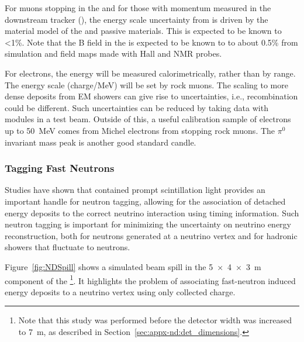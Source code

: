 
For muons stopping in the  and for those with momentum measured in the downstream tracker (), the energy scale uncertainty from  is driven by the material model of the  and passive materials.  This is expected to be known to \textless 1\%.  Note that the B field in the  is expected to be known to to about 0.5\% from simulation and field maps made with Hall and NMR probes.

For electrons, the energy will be measured calorimetrically, rather than by range.  The  energy scale (charge/MeV) will be set by rock muons.  The scaling to more dense deposits from EM showers can give rise to uncertainties, i.e., recombination could be different.  Such uncertainties can be reduced by taking data with  modules in a test beam.  Outside of this, a useful calibration sample
of electrons up to \SI{50}{MeV} comes from Michel electrons from stopping rock muons. The $\pi^0$ invariant mass peak is another good standard candle.



\subsubsection{Tagging Fast Neutrons}

Studies have shown that contained prompt scintillation light provides an important handle for neutron tagging, allowing for the association of detached energy deposits to the correct neutrino interaction using timing information. Such neutron tagging is important for minimizing the uncertainty on neutrino energy reconstruction, both for neutrons generated at a neutrino vertex and for hadronic showers that fluctuate to neutrons. 

Figure~\ref{fig:NDSpill} shows a simulated beam spill in the \SI[product-units=repeat]{5x4x3}{\metre}  component of the   \footnote{Note that this study was performed before the detector width was increased to \SI{7}{m}, as described in Section~\ref{sec:appx-nd:det_dimensions}.}. 
It highlights the problem of associating fast-neutron induced energy deposits to a neutrino vertex using only collected charge.  

